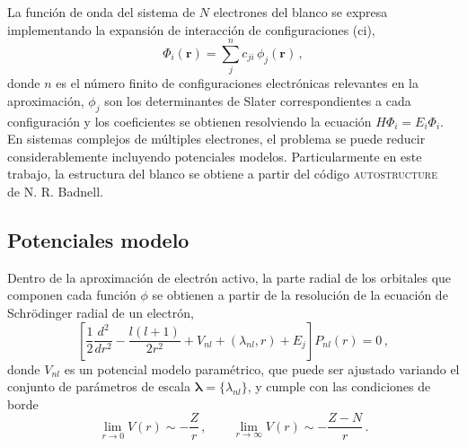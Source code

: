 La función de onda del sistema de $N$ electrones del blanco se expresa 
implementando la expansión de interacción de configuraciones (\acs{ci}),
\begin{equation*}
\Phi_i(\mathbf{r})=\sum_j^{n} c_{ji} \, \phi_j(\mathbf{r})\,,
\label{eq:phi-RM}
\end{equation*}
donde $n$ es el número finito de configuraciones electrónicas relevantes 
en la aproximación, $\phi_j$ son los determinantes de Slater 
correspondientes a cada configuración y los coeficientes se obtienen 
resolviendo la ecuación $H\Phi_i=E_i\Phi_i$. En sistemas complejos de 
múltiples electrones, el problema se puede reducir considerablemente 
incluyendo potenciales modelos. 
Particularmente en este trabajo, la estructura del blanco se obtiene
a partir del código \textsc{autostructure}~\cite{Badnell:11} de 
N. R. Badnell. 

\subsection{Potenciales modelo}
\label{subsec:potmod-rmatrix}

Dentro de la aproximación de electrón activo, la parte radial 
de los orbitales que componen cada función $\phi$ se obtienen a partir 
de la resolución de la ecuación de Schr\"odinger radial de un electrón,
\begin{equation*}
\left[ \frac{1}{2} \frac{d^2}{dr^2} - \frac{l(l+1)}{2r^2} 
 + V_{nl}+(\lambda_{nl},r) + E_j \right] P_{nl}(r)=0\,,
\label{eq:Schro-potmod}
\end{equation*}
donde $V_{nl}$ es un potencial modelo paramétrico, que puede ser 
ajustado variando el conjunto de parámetros de escala 
$\boldsymbol\lambda=\{\lambda_{nl}\}$, y cumple con las condiciones de 
borde
\begin{equation}
\lim_{r \rightarrow 0} V(r) \sim -\frac{Z}{r} \,,\qquad
\lim_{r \rightarrow \infty} V(r) \sim -\frac{Z-N}{r} \,.
\end{equation}

